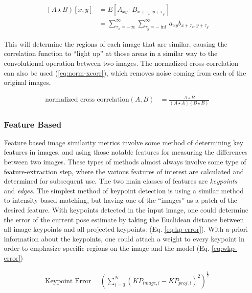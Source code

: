 \begin{equation}
    \begin{aligned}
        (A \star B)[x,y] &= E[A_{xy} \cdot B_{x + \tau_x,y+\tau_y}] \\
        &= \sum_{\tau_x=-\infty}^{\infty}\sum_{\tau_y=-\inf}^{\infty}a_{xy}b_{x + \tau_x,y + \tau_y}
    \end{aligned}
    \label{eq:xcorr}
\end{equation}

This will determine the regions of each image that are similar, causing the correlation function to ``light up'' at those areas in a similar way to the convolutional operation between two images. The normalized cross-correlation can also be used (\cref{eq:norm-xcorr}), which removes noise coming from each of the original images.

\begin{equation}
    \begin{aligned}
        \text{normalized cross correlation}(A,B) &= \frac{A \star B}{(A \star A)(B \star B)}
    \end{aligned}\label{eq:norm-xcorr}
\end{equation}

\subsubsection{Feature Based}
\label{sec:img-sim-feature}
Feature based image similarity metrics involve some method of determining key features in images, and using those notable features for measuring the differences between two images. These types of methods almost always involve some type of feature-extraction step, where the various features of interest are calculated and determined for subsequent use. The two main classes of features are \emph{keypoints} and \emph{edges}. The simplest method of keypoint detection is using a similar method to intensity-based matching, but having one of the ``images'' as a patch of the desired feature. With keypoints detected in the input image, one could determine the error of the current pose estimate by taking the Euclidean distance between all image keypoints and all projected keypoints: \cite{burtonAutomaticTrackingHealthy2021} (Eq. \ref{eq:kp-error}). With a-priori information about the keypoints, one could attach a weight to every keypoint in order to emphasize specific regions on the image and the model (Eq. \ref{eq:wkp-error})

\begin{equation}
    \begin{aligned}
        \text{Keypoint Error}= (\sum_{i = 0}^{N}(KP_{image,i} - KP_{proj,i})^2)^{\frac{1}{2}}
    \end{aligned}
    \label{eq:kp-error}
\end{equation}

